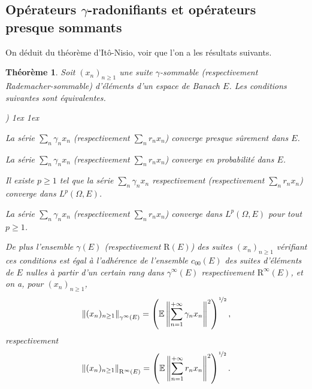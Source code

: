 \documentclass{smfart}
\theoremstyle{plain}
\newtheorem{theorem}{Théorème}[section]
\theoremstyle{definition}
\newcommand{\EE}{\mathbb E}
\newcommand{\demi}{{\nicefrac{1}{2}}}
\newcommand{\err}{\mathrm{R}}
\newcounter{aufzi}
\newenvironment{aufzi}{\begin{list}{ {\upshape\alph{aufzi})}}{
        \usecounter{aufzi}
        \topsep1ex
        \parsep0cm
        \itemsep1ex
        \leftmargin0.8cm
        \labelwidth0.5cm
        \labelsep0.3cm
}}
{\end{list}}
\newcounter{aufzii}
\newenvironment{aufzii}{\begin{list}{\hfill {\upshape(\roman{aufzii})}}{
        \usecounter{aufzii}
        \topsep1ex
        \parsep0cm
        \itemsep1ex
        \leftmargin0.8cm
        \labelwidth0.5cm
        \labelsep0.3cm
         \itemindent0cm
}}
{\end{list}}
\begin{document}
\bigskip




\subsection{Opérateurs $\gamma$-radonifiants et opérateurs presque sommants}
On déduit du théorème d'Itô-Nisio, voir \cite[Théorème~2.17]{jvn} que l'on a les résultats suivants.

\begin{theorem} \label{thm:ito-nisio} Soit $(x_n)_{n\ge 1}$ une suite
  $\gamma$-sommable (respectivement Rademacher-sommable) d'éléments
  d'un espace de Banach $E$. Les conditions suivantes sont
  équivalentes.
   \begin{aufzi}
 \item  La série  $\sum_n\gamma_nx_n$ (respectivement $\sum_n r_nx_n$) converge presque sûrement  dans $E$.
 \item  La série $\sum_n \gamma_nx_n$ (respectivement $\sum_n r_n x_n$) converge en probabilité dans $E$.
 \item Il existe $p\ge 1$ tel que la série $\sum_n \gamma_nx_n$
   respectivement (respectivement $\sum_n r_n x_n$) converge dans
   $L^p(\Omega, E)$.
 \item La série $\sum_n \gamma_nx_n$ (respectivement $\sum_n r_n x_n$)
   converge dans $L^p(\Omega, E)$ pour tout $p\ge 1$.
 \end{aufzi}
 De plus l'ensemble $\gamma(E)$ (respectivement $\err(E)$) des suites
 $(x_n)_{n\ge 1}$ vérifiant ces conditions est égal à l'adhérence de
 l'ensemble $c_{00}(E)$ des suites d'éléments de $E$ nulles à partir
 d'un certain rang dans $\gamma^\infty(E)$ respectivement
 $\err^\infty(E)$, et on a, pour $(x_n) _{n\ge 1}$,
\[
    \left \Vert (x_n)_{n\ge 1}\right \Vert_{\gamma^\infty(E)} =\left (\EE \left \Vert \sum_{n=1}^{+\infty}\gamma_nx_n\right \Vert^2\right)^{\demi},
\]
respectivement
 \[
    \left \Vert (x_n)_{n\ge 1}\right \Vert_{\err^\infty(E)} =\left (\EE \left \Vert \sum_{n=1}^{+\infty}r_nx_n\right \Vert^2\right)^{\demi}.
 \]

\end{theorem}
\end{document}
